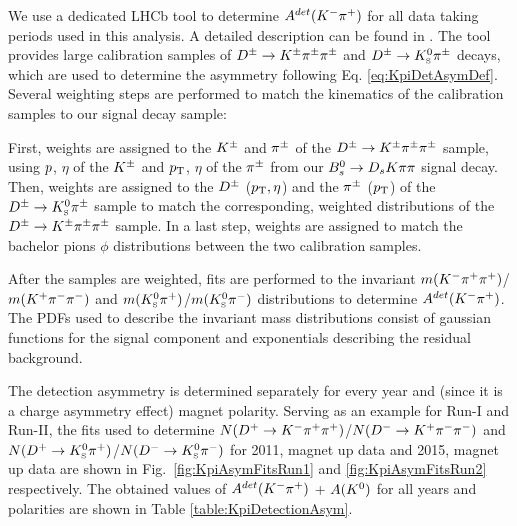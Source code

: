 We use a dedicated LHCb tool to determine $A^{det}(\Km\pip)$ for all data taking periods used in this analysis. A detailed description can be found in \cite{Davis:2310213}.
The tool provides large calibration samples of $\Dpm\to\Kpm\pipm\pipm$ and $\Dpm\to\KS\pipm$ decays, which are used to determine the asymmetry following Eq. \ref{eq:KpiDetAsymDef}. 
Several weighting steps are performed to match the kinematics of the calibration samples to our signal decay sample: 

First, weights are assigned to the $\Kpm$ and $\pipm$ of the $\Dpm\to\Kpm\pipm\pipm$ sample, using $\ptot$, $\eta$ of the $\Kpm$ and $\pt$, $\eta$ of the $\pipm$ from our $\Bs\to\Ds\kaon\pion\pion$ signal decay.
Then, weights are assigned to the $\Dpm$ ($\pt, \eta$) and the $\pipm$ ($\pt$) of the $\Dpm\to\KS\pipm$ sample to match the corresponding, weighted distributions of the $\Dpm\to\Kpm\pipm\pipm$ sample.
In a last step, weights are assigned to match the bachelor pions $\phi$ distributions between the two calibration samples.

After the samples are weighted, fits are performed to the invariant $m(\Km\pip\pip)$/$m(\Kp\pim\pim)$ and $m(\KS\pip)$/$m(\KS\pim)$ distributions to determine $A^{det}(\Km\pip)$. 
The PDFs used to describe the invariant mass distributions consist of gaussian functions for the signal component and exponentials describing the residual background.

The detection asymmetry is determined separately for every year and (since it is a charge asymmetry effect) magnet polarity. 
Serving as an example for Run-I and Run-II, the fits used to determine $N(\Dp\to\Km\pip\pip)$/$N(\Dm\to\Kp\pim\pim)$ and $N(\Dp\to\KS\pip)$/$N(\Dm\to\KS\pim)$ 
for 2011, magnet up data and 2015, magnet up data are shown in Fig.~\ref{fig:KpiAsymFitsRun1} and \ref{fig:KpiAsymFitsRun2} respectively.
The obtained values of $A^{det}(\Km\pip)$ + $A(\Kz)$ for all years and polarities are shown in Table \ref{table:KpiDetectionAsym}.


